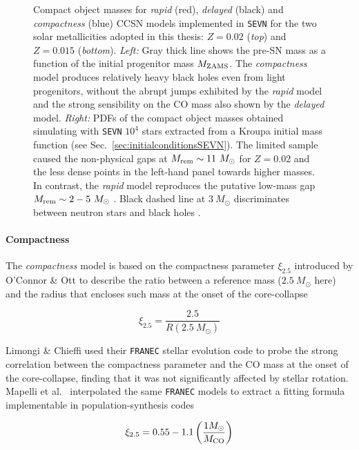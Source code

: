 \documentclass[a4paper,titlepage]{book}     	%
\newcommand{\sun}{\ensuremath{_\odot}}
\newcommand{\mzams}{M_\textup{ZAMS}}
\newcommand{\msun}{\ensuremath{M\sun}}
\begin{document}
\begin{figure}[t!]
	\caption{Compact object masses for \emph{rapid} (red), \emph{delayed} (black) and \emph{compactness} (blue) CCSN models implemented in \texttt{SEVN} for the two solar metallicities adopted in this thesis: $Z=0.02$ (\emph{top}) and $Z=0.015$ (\emph{bottom}). \emph{Left:} Gray thick line shows the pre-SN mass as a function of the initial progenitor mass $\mzams$. The \emph{compactness} model produces relatively heavy black holes even from light progenitors, without the abrupt jumps exhibited by the \emph{rapid} model and the strong sensibility on the CO mass also shown by the \emph{delayed} model. \emph{Right:} PDFs of the compact object masses obtained simulating with \texttt{SEVN} $10^4$ stars extracted from a Kroupa initial mass function (see Sec.\ \ref{sec:initialconditionsSEVN}). The limited sample caused the non-physical gaps at $M_{\rm rem} \sim 11~\msun$ for $Z=0.02$ and the less dense points in the left-hand panel towards higher masses. In contrast, the \emph{rapid} model reproduces the putative low-mass gap $M_{\rm rem} \sim 2-5~\msun$ \cite{massgapreal_ozel2010}. Black dashed line at $3~\msun$ discriminates between neutron stars and black holes \cite{NSreview}. }\label{fig:remnants}
\end{figure}


\paragraph{Compactness} The \emph{compactness} model is based on the compactness parameter $\xi_\mathrm{2.5}$ introduced by O'Connor \& Ott \cite{Oconnor2011_compactness} to describe the ratio between a reference mass ($2.5~\msun$ here) and the radius that encloses such mass at the onset of the core-collapse

\begin{equation}\label{eq:compactness}
\xi_\mathrm{2.5}= \frac{2.5}{R(2.5 ~\msun)}
\end{equation}

Limongi \& Chieffi \cite{Limongi2018_rotatingCOcompactness} used their \texttt{FRANEC} stellar evolution code to probe the strong correlation between the compactness parameter and the CO mass at the onset of the core-collapse, finding that it was not significantly affected by stellar rotation. Mapelli et al.\ \cite{mapelli2020_compactness} interpolated the same \texttt{FRANEC} models to extract a fitting formula implementable in population-synthesis codes

\begin{equation}\label{eq:compactnessCOinSEVN}
	\xi_{2.5} = 0.55 -1.1 \left(\frac{1 \msun}{M_{\rm CO}}\right)
\end{equation}
\end{document}
